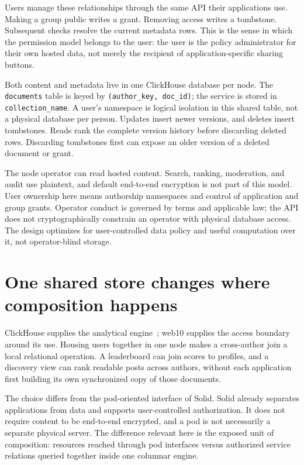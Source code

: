 \documentclass[sigconf, nonacm]{acmart}
\begin{document}
Users manage these relationships through the same API their applications
use. Making a group public writes a grant. Removing access writes a
tombstone. Subsequent checks resolve the current metadata rows. This is
the sense in which the permission model belongs to the user: the user is
the policy administrator for their own hosted data, not merely the
recipient of application-specific sharing buttons.

Both content and metadata live in one ClickHouse database per node.
The \texttt{documents} table is keyed by \texttt{(author\_key, doc\_id)};
the service is stored in \texttt{collection\_name}. A user's namespace is
logical isolation in this shared table, not a physical database per
person. Updates insert newer versions, and deletes insert tombstones.
Reads rank the complete version history before discarding deleted rows.
Discarding tombstones first can expose an older version of a deleted
document or grant.

The node operator can read hosted content. Search, ranking, moderation,
and audit use plaintext, and default end-to-end encryption is not part
of this model. User ownership here means authorship namespaces and
control of application and group grants. Operator conduct is governed
by terms and applicable law; the API does not cryptographically constrain
an operator with physical database access. The design optimizes for
user-controlled data policy and useful computation over it, not
operator-blind storage.

\section{One shared store changes where composition happens}
\label{sec:store}

ClickHouse supplies the analytical engine~\cite{clickhouse2024}; web10
supplies the access boundary around its use. Housing users together in
one node makes a cross-author join a local relational operation. A
leaderboard can join scores to profiles, and a discovery view can rank
readable posts across authors, without each application first building
its own synchronized copy of those documents.

The choice differs from the pod-oriented interface of Solid.
Solid already separates applications from data and supports
user-controlled authorization. It does not require content to be
end-to-end encrypted, and a pod is not necessarily a separate physical
server. The difference relevant here is the exposed unit of composition:
resources reached through pod interfaces versus authorized service
relations queried together inside one columnar engine.
\end{document}
